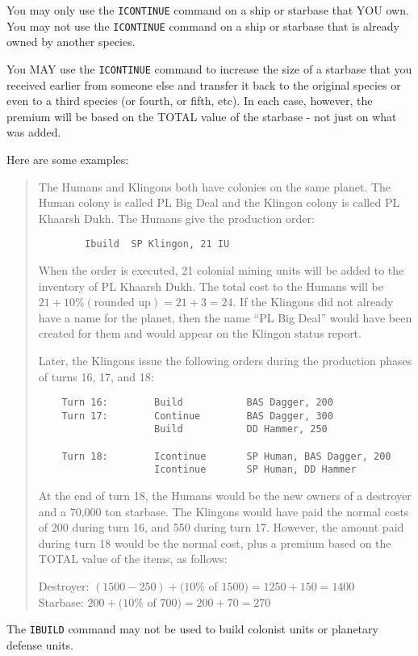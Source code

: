 \documentclass[10pt,titlepage]{article}
\begin{document}
You may only use the \texttt{ICONTINUE} command on a ship or starbase that YOU own.  You
may not use the \texttt{ICONTINUE} command on a ship or starbase that is already owned
by another species.

You MAY use the \texttt{ICONTINUE} command to increase the size of a starbase that you
received earlier from someone else and transfer it back to the original species
or even to a third species (or fourth, or fifth, etc).  In each case, however,
the premium will be based on the TOTAL value of the starbase - not just on what
was added.

Here are some examples:
\begin{quotation}
	\noindent The Humans and Klingons both have colonies on the same planet.
	The Human colony is called PL Big Deal and the Klingon colony is
	called PL Khaarsh Dukh.  The Humans give the production order:

\begin{verbatim}
		Ibuild	SP Klingon, 21 IU
\end{verbatim} 

	When the order is executed, 21 colonial mining units will be added
	to the inventory of PL Khaarsh Dukh.  The total cost to the Humans
	will be $21 + 10\% (\textrm{rounded up}) = 21 + 3 = 24$.  If the Klingons did
	not already have a name for the planet, then the name ``PL Big Deal''
	would have been created for them and would appear on the Klingon
	status report.

	Later, the Klingons issue the following orders during the production
	phases of turns 16, 17, and 18:
\begin{verbatim}
    Turn 16:        Build           BAS Dagger, 200
    Turn 17:        Continue        BAS Dagger, 300
                    Build           DD Hammer, 250

    Turn 18:        Icontinue       SP Human, BAS Dagger, 200
                    Icontinue       SP Human, DD Hammer
\end{verbatim} 

	At the end of turn 18, the Humans would be the new owners of a
	destroyer and a 70,000 ton starbase.  The Klingons would have paid
	the normal costs of 200 during turn 16, and 550 during turn 17.
	However, the amount paid during turn 18 would be the normal cost,
	plus a premium based on the TOTAL value of the items, as follows:

		\noindent Destroyer:  $(1500 - 250) + (10\%$ of $1500) = 1250 + 150 = 1400$ \\
		Starbase: $200 + (10\%$ of $700) = 200 + 70 = 270$
\end{quotation}
The \texttt{IBUILD} command may not be used to build colonist units or planetary defense
units.
\end{document}
